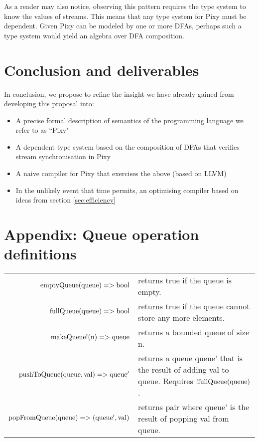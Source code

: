 \documentclass{scrartcl}
\begin{document}
    As a reader may also notice, observing this pattern requires the type system to know the values of streams. This means that any type system for Pixy must be dependent. Given Pixy can be modeled by one or more DFAs, perhaps such a type system would yield an algebra over DFA composition.
    
    \section{Conclusion and deliverables}

    In conclusion, we propose to refine the insight we have already gained from developing this proposal into:
    \begin{itemize}
        \item A precise formal description of semantics of the programming language we refer to as ``Pixy"
        \item A dependent type system based on the composition of DFAs that verifies stream synchronisation in Pixy
        \item A naive compiler for Pixy that exercises the above (based on LLVM)
        \item In the unlikely event that time permits, an optimising compiler based on ideas from section \ref{sec:efficiency}
    \end{itemize}

    \appendix

    \section{Appendix: Queue operation definitions}
    \label{app:queueops}

    \begin{tabularx}{\textwidth}{ @{} r | Y @{} }
        $\textnormal{emptyQueue}(\textnormal{queue}) => \textnormal{bool}$ & returns true if the queue is empty. \\
        $\textnormal{fullQueue}(\textnormal{queue}) => \textnormal{bool}$ & returns true if the queue cannot store any more elements. \\
        $\textnormal{makeQueue!}(\textnormal{n}) => \textnormal{queue}$ & returns a bounded queue of size n. \\
        $\textnormal{pushToQueue}(\textnormal{queue}, \textnormal{val}) => \textnormal{queue}'$ & returns a queue queue' that is the result of adding val to queue. Requires $!\textnormal{fullQueue}(\textnormal{queue})$. \\
        $\textnormal{popFromQueue}(\textnormal{queue}) => (\textnormal{queue}', \textnormal{val})$ & returns pair where queue' is the result of popping val from queue.
    \end{tabularx}
\end{document}

